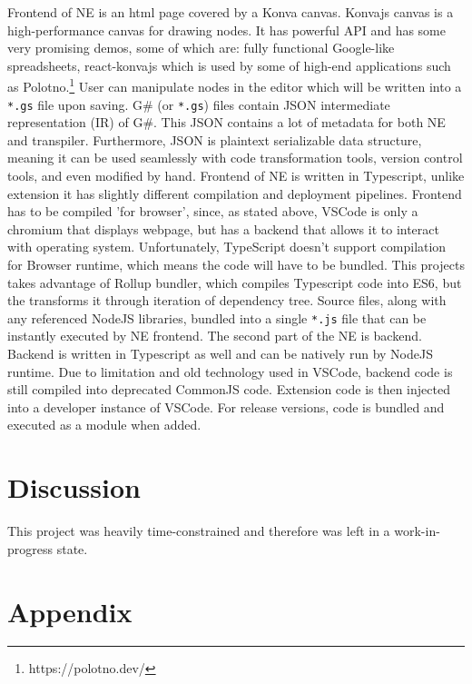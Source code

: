 \documentclass{article}
\begin{document}
Frontend of NE is an html page covered by a Konva canvas. Konvajs canvas is a high-performance canvas for drawing nodes. It has powerful API and has some very promising demos, some of which are: fully functional Google-like spreadsheets, react-konvajs which is used by some of high-end applications such as Polotno.\footnote{https://polotno.dev/}
User can manipulate nodes in the editor which will be written into a \lstinline[columns=fixed]{*.gs} file upon saving. G\# (or \lstinline[columns=fixed]{*.gs}) files contain JSON intermediate representation (IR) of G\#. This JSON contains a lot of metadata for both NE and transpiler. Furthermore, JSON is plaintext serializable data structure, meaning it can be used seamlessly with code transformation tools, version control tools, and even modified by hand.
Frontend of NE is written in Typescript, unlike extension it has slightly different compilation and deployment pipelines. Frontend has to be compiled 'for browser', since, as stated above, VSCode is only a chromium that displays webpage, but has a backend that allows it to interact with operating system. Unfortunately, TypeScript doesn't support compilation for Browser runtime, which means the code will have to be bundled. This projects takes advantage of Rollup bundler, which compiles Typescript code into ES6, but the transforms it through iteration of dependency tree. Source files, along with any referenced NodeJS libraries, bundled into a single \lstinline[columns=fixed]{*.js} file that can be instantly executed by NE frontend.
The second part of the NE is backend. Backend is written in Typescript as well and can be natively run by NodeJS runtime. Due to limitation and old technology used in VSCode, backend code is still compiled into deprecated CommonJS code. Extension code is then injected into a developer instance of VSCode. For release versions, code is bundled and executed as a module when added.

\section{Discussion}
This project was heavily time-constrained and therefore was left in a work-in-progress state.






\section{Appendix}


\pagebreak


\end{document}
